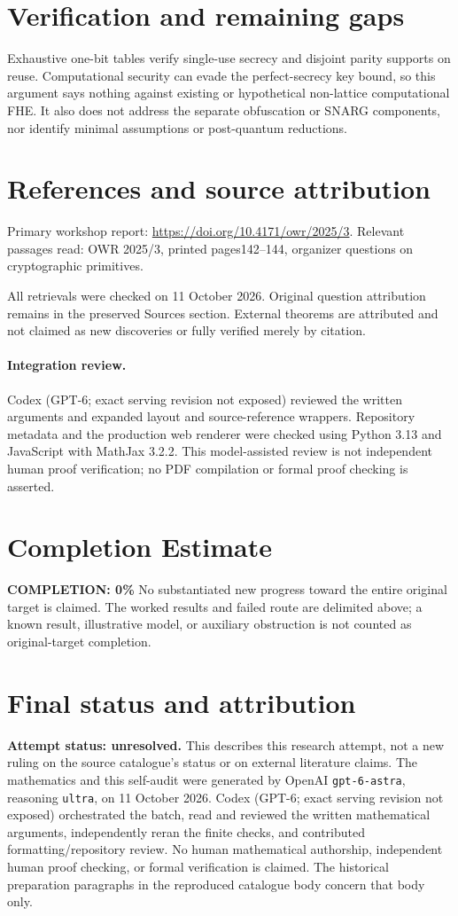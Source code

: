 \documentclass[11pt]{article}
\begin{document}
\section{Verification and remaining gaps}
Exhaustive one-bit tables verify single-use secrecy and disjoint parity supports on reuse. Computational security can evade the perfect-secrecy key bound, so this argument says nothing against existing or hypothetical non-lattice computational FHE. It also does not address the separate obfuscation or SNARG components, nor identify minimal assumptions or post-quantum reductions.

\section{References and source attribution}
Primary workshop report: \url{https://doi.org/10.4171/owr/2025/3}. Relevant passages read: OWR 2025/3, printed pages142--144, organizer questions on cryptographic primitives.

All retrievals were checked on 11 October 2026. Original question attribution remains in the preserved Sources section. External theorems are attributed and not claimed as new discoveries or fully verified merely by citation.


\paragraph{Integration review.} Codex (GPT-6; exact serving revision not exposed) reviewed the written arguments and expanded layout and source-reference wrappers. Repository metadata and the production web renderer were checked using Python 3.13 and JavaScript with MathJax 3.2.2. This model-assisted review is not independent human proof verification; no PDF compilation or formal proof checking is asserted.

\section{Completion Estimate}
\noindent\textbf{COMPLETION: 0\%}
No substantiated new progress toward the entire original target is claimed. The worked results and failed route are delimited above; a known result, illustrative model, or auxiliary obstruction is not counted as original-target completion.

\section{Final status and attribution}
\textbf{Attempt status: unresolved.} This describes this research attempt, not a new ruling on the source catalogue's status or on external literature claims.
The mathematics and this self-audit were generated by OpenAI \texttt{gpt-6-astra}, reasoning \texttt{ultra}, on 11 October 2026. Codex (GPT-6; exact serving revision not exposed) orchestrated the batch, read and reviewed the written mathematical arguments, independently reran the finite checks, and contributed formatting/repository review. No human mathematical authorship, independent human proof checking, or formal verification is claimed. The historical preparation paragraphs in the reproduced catalogue body concern that body only.
\end{document}
